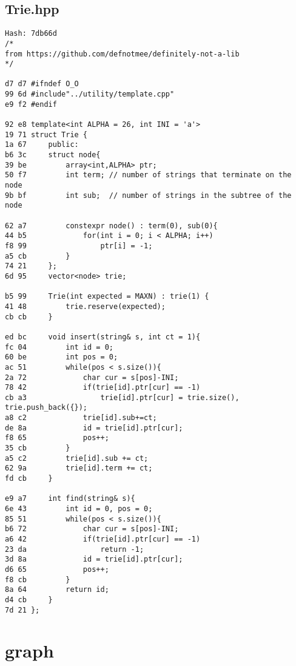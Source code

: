 \documentclass[11pt, a4paper, twoside]{article}
\begin{document}
\subsection{Trie.hpp}
\begin{lstlisting}
Hash: 7db66d
/*
from https://github.com/defnotmee/definitely-not-a-lib
*/

d7 d7 #ifndef O_O
99 6d #include"../utility/template.cpp"
e9 f2 #endif

92 e8 template<int ALPHA = 26, int INI = 'a'>
19 71 struct Trie {
1a 67     public:
b6 3c     struct node{
39 be         array<int,ALPHA> ptr;
50 f7         int term; // number of strings that terminate on the node
9b bf         int sub;  // number of strings in the subtree of the node
      
62 a7         constexpr node() : term(0), sub(0){
44 b5             for(int i = 0; i < ALPHA; i++)
f8 99                 ptr[i] = -1;
a5 cb         }
74 21     };
6d 95     vector<node> trie;
      
b5 99     Trie(int expected = MAXN) : trie(1) {
41 48         trie.reserve(expected);
cb cb     }
      
ed bc     void insert(string& s, int ct = 1){
fc 04         int id = 0;
60 be         int pos = 0;
ac 51         while(pos < s.size()){
2a 72             char cur = s[pos]-INI;
78 42             if(trie[id].ptr[cur] == -1)
cb a3                 trie[id].ptr[cur] = trie.size(), trie.push_back({});
a8 c2             trie[id].sub+=ct;
de 8a             id = trie[id].ptr[cur];
f8 65             pos++;
35 cb         }
a5 c2         trie[id].sub += ct;
62 9a         trie[id].term += ct;
fd cb     }
      
e9 a7     int find(string& s){
6e 43         int id = 0, pos = 0;
85 51         while(pos < s.size()){
b6 72             char cur = s[pos]-INI;
a6 42             if(trie[id].ptr[cur] == -1)
23 da                 return -1;
3d 8a             id = trie[id].ptr[cur];
d6 65             pos++;
f8 cb         }
8a 64         return id;
d4 cb     }
7d 21 };
\end{lstlisting}



%
%

\section{graph}
\end{document}
